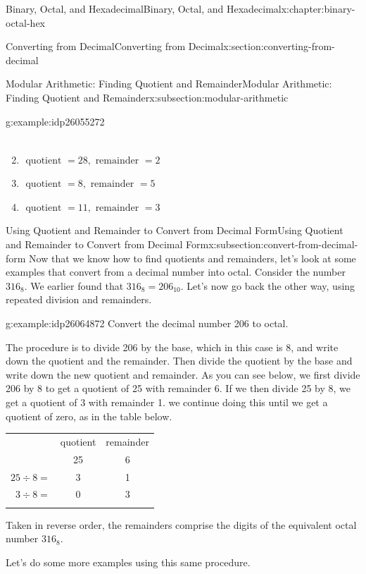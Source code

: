 \documentclass[twoside,10pt,]{book}
\newcommand{\tabularfont}{\relax}
\numberwithin{equation}{section}
\newcommand{\hrulemedium}{\noalign{\hrule height 0.07em}}
\newcommand{\hrulethick} {\noalign{\hrule height 0.11em}}
\begin{document}
\begin{chapterptx}{Binary, Octal, and Hexadecimal}{}{Binary, Octal, and Hexadecimal}{}{}{x:chapter:binary-octal-hex}
\begin{sectionptx}{Converting from Decimal}{}{Converting from Decimal}{}{}{x:section:converting-from-decimal}
\begin{subsectionptx}{Modular Arithmetic: Finding Quotient and Remainder}{}{Modular Arithmetic: Finding Quotient and Remainder}{}{}{x:subsection:modular-arithmetic}
\begin{example}{}{g:example:idp26055272}
\begin{enumerate}
\begin{align*}
\end{align*}
%
\item{}\(\displaystyle \text{ quotient }=28,\text{ remainder }=2\)%
\item{}\(\displaystyle \text{ quotient }=8,\text{ remainder }=5\)%
\item{}\(\displaystyle \text{ quotient }=11,\text{ remainder }=3\)%
\end{enumerate}
\end{example}
\end{subsectionptx}
%
%
\typeout{************************************************}
\typeout{************************************************}
%
\begin{subsectionptx}{Using Quotient and Remainder to Convert from Decimal Form}{}{Using Quotient and Remainder to Convert from Decimal Form}{}{}{x:subsection:convert-from-decimal-form}
Now that we know how to find quotients and remainders, let's look at some examples that convert from a decimal number into octal.  Consider the number \(316_8\).  We earlier found that \(316_8=206_{10}\).  Let's now go back the other way, using repeated division and remainders.%
\begin{example}{}{g:example:idp26064872}%
Convert the decimal number 206 to octal.%
\par
The procedure is to divide 206 by the base, which in this case is 8, and write down the quotient and the remainder.  Then divide the quotient by the base and write down the new quotient and remainder.  As you can see below, we first divide 206 by 8 to get a quotient of 25 with remainder 6.  If we then divide 25 by 8, we get a quotient of 3 with remainder 1.  we continue doing this until we get a quotient of zero, as in the table below. \begin{center}%
{\tabularfont%
\begin{tabular}{ccc}\hrulethick
&quotient&remainder\tabularnewline\hrulemedium
\multicolumn{1}{r}{\(206\div 8=\)}&25&6\tabularnewline[0pt]
\multicolumn{1}{r}{\(25\div 8=\)}&3&1\tabularnewline[0pt]
\multicolumn{1}{r}{\(3\div 8 =\)}&0&3\tabularnewline\hrulethick
\end{tabular}
}%
\end{center}%
%
\par
Taken in reverse order, the remainders comprise the digits of the equivalent octal number \(316_8\).%
\end{example}
Let's do some more examples using this same procedure.%

\end{subsectionptx}
\end{sectionptx}
\end{chapterptx}
\end{document}
